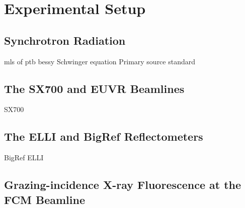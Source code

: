 \chapter{Experimental Setup}
\section{Synchrotron Radiation}
\Gls{mls} \cite{brandt_metrology_2007} of \gls{ptb}
\Gls{bessy}
Schwinger equation \cite{schwinger_classical_1949}
Primary source standard \cite{thornagel_electron_2001}
\section{The SX700 and EUVR Beamlines}
SX700 \cite{beckhoff_quarter-century_2009}
\section{The ELLI and BigRef Reflectometers}
BigRef \cite{scholze_high-accuracy_2001}
ELLI \cite{soltwisch_polarization_2015}
\section{Grazing-incidence X-ray Fluorescence at the FCM Beamline}